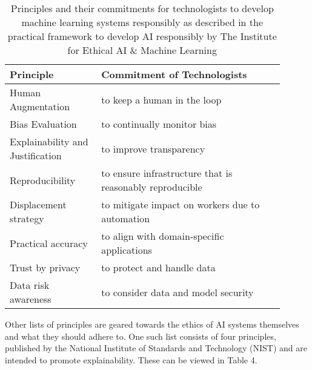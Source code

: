 \documentclass{svproc}
\begin{document}
\begin{table}
  \caption{Principles and their commitments for technologists to develop machine learning systems responsibly as described in the practical framework to develop AI responsibly by The Institute for Ethical AI {\&} Machine Learning \cite{TheInstituteforEthicalAiMachineLearning2021TheSystems.}}
  \label{tab:princ}
  \begin{tabular}{p{0.30\linewidth} p{0.6\linewidth}}
    \hline
    Principle&Commitment of Technologists\\
    \hline
    Human Augmentation & to keep a human in the loop\\ \hline
    Bias Evaluation & to continually monitor bias\\\hline
    Explainability and Justification & to improve transparency\\\hline
    Reproducibility & to ensure infrastructure that is reasonably reproducible\\\hline
    Displacement strategy & to mitigate impact on workers due to automation\\\hline
    Practical accuracy & to align with domain-specific applications\\\hline
    Trust by privacy & to protect and handle data\\\hline
    Data risk awareness & to consider data and model security \\ 
  \hline
\end{tabular}
\end{table}




Other lists of principles are geared towards the ethics of AI systems themselves and what they should adhere to. One such list consists of four principles, published by the National Institute of Standards and Technology (NIST) \cite{Phillips2021FourIntelligence} and are intended to promote explainability. These can be viewed in Table 4. 
\end{document}
